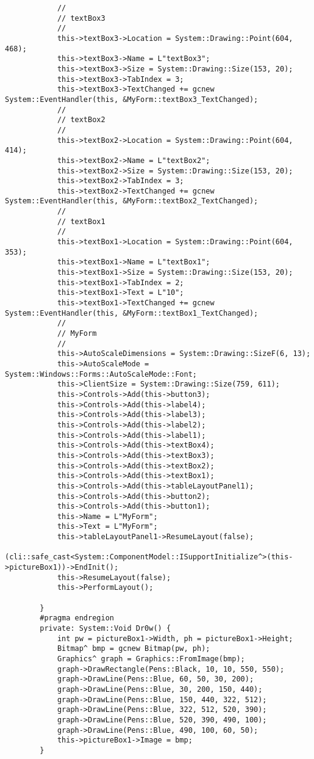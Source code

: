 \documentclass[a4paper,12pt]{article}
\begin{document}
\begin{verbatim}
			// 
			// textBox3
			// 
			this->textBox3->Location = System::Drawing::Point(604, 468);
			this->textBox3->Name = L"textBox3";
			this->textBox3->Size = System::Drawing::Size(153, 20);
			this->textBox3->TabIndex = 3;
			this->textBox3->TextChanged += gcnew System::EventHandler(this, &MyForm::textBox3_TextChanged);
			// 
			// textBox2
			// 
			this->textBox2->Location = System::Drawing::Point(604, 414);
			this->textBox2->Name = L"textBox2";
			this->textBox2->Size = System::Drawing::Size(153, 20);
			this->textBox2->TabIndex = 3;
			this->textBox2->TextChanged += gcnew System::EventHandler(this, &MyForm::textBox2_TextChanged);
			// 
			// textBox1
			// 
			this->textBox1->Location = System::Drawing::Point(604, 353);
			this->textBox1->Name = L"textBox1";
			this->textBox1->Size = System::Drawing::Size(153, 20);
			this->textBox1->TabIndex = 2;
			this->textBox1->Text = L"10";
			this->textBox1->TextChanged += gcnew System::EventHandler(this, &MyForm::textBox1_TextChanged);
			// 
			// MyForm
			// 
			this->AutoScaleDimensions = System::Drawing::SizeF(6, 13);
			this->AutoScaleMode = System::Windows::Forms::AutoScaleMode::Font;
			this->ClientSize = System::Drawing::Size(759, 611);
			this->Controls->Add(this->button3);
			this->Controls->Add(this->label4);
			this->Controls->Add(this->label3);
			this->Controls->Add(this->label2);
			this->Controls->Add(this->label1);
			this->Controls->Add(this->textBox4);
			this->Controls->Add(this->textBox3);
			this->Controls->Add(this->textBox2);
			this->Controls->Add(this->textBox1);
			this->Controls->Add(this->tableLayoutPanel1);
			this->Controls->Add(this->button2);
			this->Controls->Add(this->button1);
			this->Name = L"MyForm";
			this->Text = L"MyForm";
			this->tableLayoutPanel1->ResumeLayout(false);
			(cli::safe_cast<System::ComponentModel::ISupportInitialize^>(this->pictureBox1))->EndInit();
			this->ResumeLayout(false);
			this->PerformLayout();
			
		}
		#pragma endregion
		private: System::Void Dr0w() {
			int pw = pictureBox1->Width, ph = pictureBox1->Height;
			Bitmap^ bmp = gcnew Bitmap(pw, ph);
			Graphics^ graph = Graphics::FromImage(bmp);
			graph->DrawRectangle(Pens::Black, 10, 10, 550, 550);
			graph->DrawLine(Pens::Blue, 60, 50, 30, 200);
			graph->DrawLine(Pens::Blue, 30, 200, 150, 440);
			graph->DrawLine(Pens::Blue, 150, 440, 322, 512);
			graph->DrawLine(Pens::Blue, 322, 512, 520, 390);
			graph->DrawLine(Pens::Blue, 520, 390, 490, 100);
			graph->DrawLine(Pens::Blue, 490, 100, 60, 50);
			this->pictureBox1->Image = bmp;
		}
		

\end{verbatim}
\end{document}
